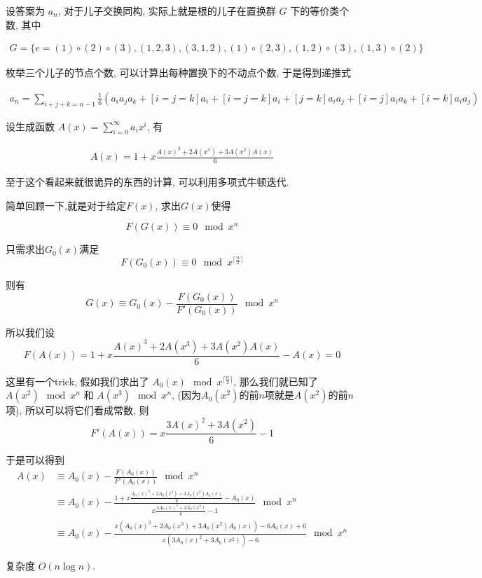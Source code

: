 \documentclass{ctexart}
\begin{document}
设答案为 $a_n$, 对于儿子交换同构, 实际上就是根的儿子在置换群 $G$ 下的等价类个数, 其中

\begin{align*}
    G=\{e=(1)\circ(2)\circ(3),(1,2,3),(3,1,2),(1)\circ(2,3),(1,2)\circ(3),(1,3)\circ(2)\} 
\end{align*}

枚举三个儿子的节点个数, 可以计算出每种置换下的不动点个数, 于是得到递推式

\begin{align*}
    a_n=\sum_{i+j+k=n-1}\frac{1}{6}(a_i a_j a_k + [i=j=k]a_i + [i=j=k]a_i + [j=k]a_i a_j + [i=j]a_i a_k + [i=k]a_i a_j)
\end{align*}

设生成函数 $A(x)=\sum_{i=0}^{\infty} a_i x^i$, 有

\begin{align*}
    A(x)=1+x\frac{A(x)^3+2A(x^3)+3A(x^2)A(x)}{6}
\end{align*}

至于这个看起来就很诡异的东西的计算, 可以利用多项式牛顿迭代.

简单回顾一下,就是对于给定$F(x)$, 求出$G(x)$使得

$$
F(G(x))\equiv 0 \mod x^n
$$

只需求出$G_0(x)$满足
$$
F(G_0(x))\equiv 0 \mod x^{\lceil \frac{n}{2} \rceil}
$$

则有
$$
G(x)\equiv G_0(x)-\frac{F(G_0(x))}{F'(G_0(x))} \mod x^n
$$

所以我们设 
$$
F(A(x))=1+x\frac{A(x)^3+2A(x^3)+3A(x^2)A(x)}{6}-A(x)=0
$$

这里有一个trick,
假如我们求出了 $A_0(x) \mod x^{\lceil \frac{n}{2} \rceil}$, 
那么我们就已知了 $A(x^2) \mod x^n$ 和 $A(x^3) \mod x^n$, 
(因为$A_0(x^2)$的前$n$项就是$A(x^2)$的前$n$项), 
所以可以将它们看成常数, 则
$$
F'(A(x))=x\frac{3A(x)^2+3A(x^2)}{6}-1
$$

于是可以得到
\begin{align*}
    A(x) &\equiv A_0(x)-\frac{F(A_0(x))}{F'(A_0(x))} \mod x^n\\
         &\equiv A_0(x)-\frac{1+x\frac{A_0(x)^3+2A_0(x^3)+3A_0(x^2)A_0(x)}{6}-A_0(x)}{x\frac{3A_0(x)^2+3A_0(x^2)}{6}-1} \mod x^n\\
         &\equiv A_0(x)-\frac{x(A_0(x)^3+2A_0(x^3)+3A_0(x^2)A_0(x))-6A_0(x)+6}{x(3A_0(x)^2+3A_0(x^2))-6} \mod x^n
\end{align*}

复杂度 $O(n\log n)$.
\end{document}
